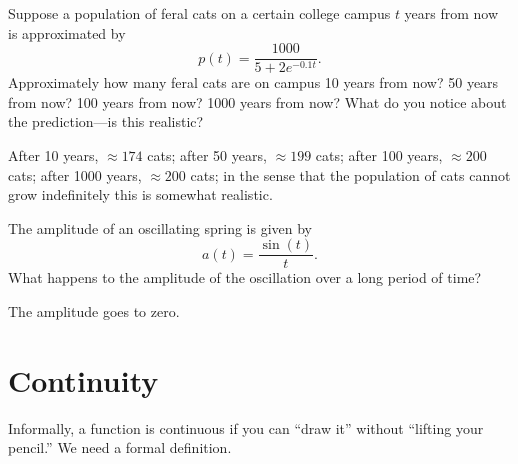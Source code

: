 \begin{exercises}
\endtwocol

\begin{exercise}
Suppose a population of feral cats on a certain college campus $t$
years from now is approximated by
\[
p(t) = \frac{1000}{5+ 2e^{-0.1 t}}.
\]
Approximately how many feral cats are on campus 10 years from now? 50
years from now? 100 years from now? 1000 years from now? What do you
notice about the prediction---is this realistic?
\begin{answer}
After 10 years, $\approx 174$ cats; after 50 years, $\approx 199$
cats; after 100 years, $\approx 200$ cats; after 1000 years, $\approx
200$ cats; in the sense that the population of cats cannot grow
indefinitely this is somewhat realistic.
\end{answer}
\end{exercise}

\begin{exercise}
The amplitude of an oscillating spring is given by
\[
a(t) = \frac{\sin(t)}{t}.
\]
What happens to the amplitude of the oscillation over a long period of
time?
\begin{answer}
The amplitude goes to zero. 
\end{answer}
\end{exercise}
\end{exercises}




\section{Continuity}


Informally, a function is continuous if you can ``draw it'' without
``lifting your pencil.'' We need a formal definition.

